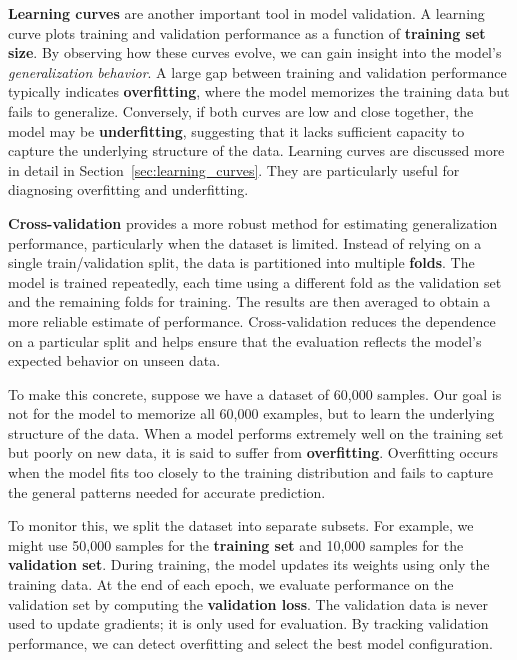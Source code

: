 \documentclass{article}
\begin{document}
\textbf{Learning curves} are another important tool in model validation. A learning curve plots training and validation performance as a function of \textbf{training set size}. By observing how these curves evolve, we can gain insight into the model’s \textit{generalization behavior}. A large gap between training and validation performance typically indicates \textbf{overfitting}, where the model memorizes the training data but fails to generalize. Conversely, if both curves are low and close together, the model may be \textbf{underfitting}, suggesting that it lacks sufficient capacity to capture the underlying structure of the data. Learning curves are discussed more in detail in Section~\ref{sec:learning_curves}. They are particularly useful for diagnosing overfitting and underfitting.

\textbf{Cross-validation} provides a more robust method for estimating generalization performance, particularly when the dataset is limited. Instead of relying on a single train/validation split, the data is partitioned into multiple \textbf{folds}. The model is trained repeatedly, each time using a different fold as the validation set and the remaining folds for training. The results are then averaged to obtain a more reliable estimate of performance. Cross-validation reduces the dependence on a particular split and helps ensure that the evaluation reflects the model’s expected behavior on unseen data.

To make this concrete, suppose we have a dataset of 60{,}000 samples. Our goal is not for the model to memorize all 60{,}000 examples, but to learn the underlying structure of the data. When a model performs extremely well on the training set but poorly on new data, it is said to suffer from \textbf{overfitting}. Overfitting occurs when the model fits too closely to the training distribution and fails to capture the general patterns needed for accurate prediction.

To monitor this, we split the dataset into separate subsets. For example, we might use 50{,}000 samples for the \textbf{training set} and 10{,}000 samples for the \textbf{validation set}. During training, the model updates its weights using only the training data. At the end of each epoch, we evaluate performance on the validation set by computing the \textbf{validation loss}. The validation data is never used to update gradients; it is only used for evaluation. By tracking validation performance, we can detect overfitting and select the best model configuration.
\end{document}
